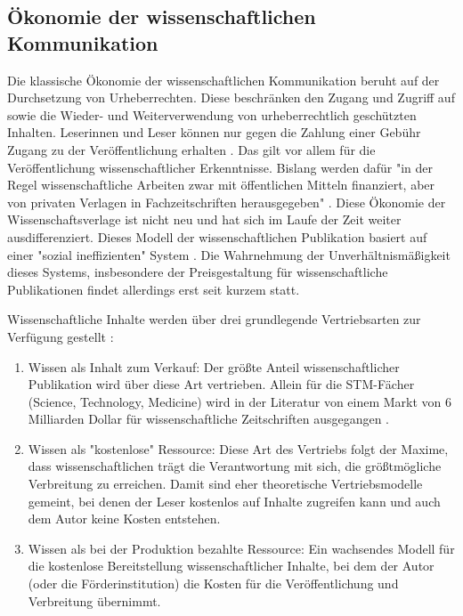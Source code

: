 \subsection{Ökonomie der wissenschaftlichen Kommunikation}
Die klassische Ökonomie der wissenschaftlichen Kommunikation beruht auf der Durchsetzung von Urheberrechten. Diese beschränken den Zugang und Zugriff auf sowie die Wieder- und Weiterverwendung von urheberrechtlich geschützten Inhalten. Leserinnen und Leser können nur gegen die Zahlung einer Gebühr Zugang zu der Veröffentlichung erhalten \cite{CREATe_2014}. Das gilt vor allem für die Veröffentlichung wissenschaftlicher Erkenntnisse. Bislang werden dafür "in der Regel wissenschaftliche Arbeiten zwar mit öffentlichen Mitteln finanziert, aber von privaten Verlagen in Fachzeitschriften herausgegeben" \cite{WD_bundestag_2009}. Diese Ökonomie der Wissenschaftsverlage ist nicht neu und hat sich im Laufe der Zeit weiter ausdifferenziert. Dieses Modell der wissenschaftlichen Publikation basiert auf einer "sozial ineffizienten" System \cite{mueller-langer_2010}. Die Wahrnehmung der Unverhältnismäßigkeit dieses Systems, insbesondere der Preisgestaltung für wissenschaftliche Publikationen \cite{King_2008} findet allerdings erst seit kurzem statt\cite{CREATe_2014}.

Wissenschaftliche Inhalte werden über drei grundlegende Vertriebsarten zur Verfügung gestellt \cite{cope2014future}:
\begin{enumerate}
\item Wissen als Inhalt zum Verkauf: Der größte Anteil wissenschaftlicher Publikation wird über diese Art vertrieben. Allein für die STM-Fächer (Science, Technology, Medicine) wird in der Literatur von einem Markt von 6 Milliarden Dollar für wissenschaftliche Zeitschriften ausgegangen .
\item Wissen als "kostenlose" Ressource: Diese Art des Vertriebs folgt der Maxime, dass wissenschaftlichen trägt die Verantwortung mit sich, die größtmögliche Verbreitung zu erreichen. Damit sind eher theoretische Vertriebsmodelle gemeint, bei denen der Leser kostenlos auf Inhalte zugreifen kann und auch dem Autor keine Kosten entstehen.
\item Wissen als bei der Produktion bezahlte Ressource: Ein wachsendes Modell für die kostenlose Bereitstellung wissenschaftlicher Inhalte, bei dem der Autor (oder die Förderinstitution) die Kosten für die Veröffentlichung und Verbreitung übernimmt.
\end{enumerate}

